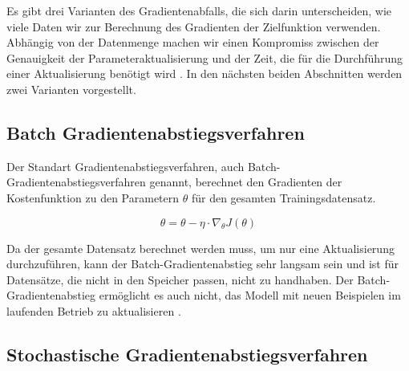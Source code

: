 

        Es gibt drei Varianten des Gradientenabfalls, die sich darin unterscheiden, wie viele Daten wir zur Berechnung des Gradienten der Zielfunktion verwenden. Abhängig von der Datenmenge machen wir einen Kompromiss zwischen der Genauigkeit der Parameteraktualisierung und der Zeit, die für die Durchführung einer Aktualisierung benötigt wird \cite*{Ruder2016}. In den nächsten beiden Abschnitten werden zwei Varianten vorgestellt.

        \subsection{Batch Gradientenabstiegsverfahren}
        Der Standart Gradientenabstiegsverfahren, auch Batch-Gradientenabstiegsverfahren genannt, berechnet den Gradienten der Kostenfunktion zu den Parametern $\theta$ für den gesamten Trainingsdatensatz.


        \begin{equation} \label{FormelGradBatch}
            \theta = \theta - \eta \cdot \nabla_{\theta}J(\theta)
        \end{equation}

        Da der gesamte Datensatz berechnet werden muss, um nur eine Aktualisierung durchzuführen, kann der Batch-Gradientenabstieg sehr langsam sein und ist für Datensätze, die nicht in den Speicher passen, nicht zu handhaben. Der Batch-Gradientenabstieg ermöglicht es auch nicht, das Modell mit neuen Beispielen im laufenden Betrieb zu aktualisieren \cite*{Ruder2016}.

        \subsection{Stochastische Gradientenabstiegsverfahren}

